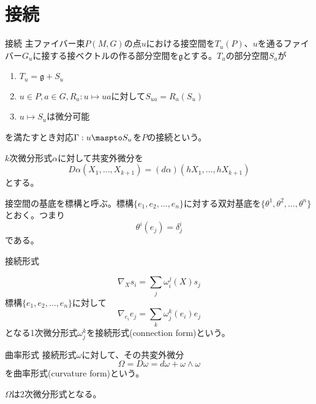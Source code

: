\section{接続}

\begin{dfn}{接続}
	主ファイバー束$P(M, G)$の点$u$における接空間を$T_u(P)$、$u$を通るファイバー$G_u$に接する接ベクトルの作る部分空間を$\mathfrak{g}$とする。$T_u$の部分空間$S_u$が
	\begin{enumerate}
		\item $T_u = \mathfrak{g} + S_u$
		\item $u \in P, a \in G, R_a: u \mapsto ua$に対して$S_{ua} = R_a(S_u)$
		\item $u \mapsto S_u$は微分可能
	\end{enumerate}
	を満たすとき対応$\Gamma: u \maspto S_u$を$P$の接続という。
\end{dfn}

$k$次微分形式$\alpha$に対して共変外微分を
	\[D\alpha(X_1, \ldots, X_{k+1}) = (d\alpha)(hX_1, \ldots, hX_{k+1})\]
とする。

接空間の基底を標構と呼ぶ。標構$\{e_1, e_2, \dots, e_n\}$に対する双対基底を$\{\theta^1, \theta^2, \dots, \theta^n\}$とおく。つまり
	\[\theta^i(e_j) = \delta^i_j\]
である。

\begin{dfn}{接続形式}
	
		\[\nabla_Xs_i = \sum_j \omega^j_i(X)s_j\]
	標構$\{e_1, e_2, \dots, e_n\}$に対して
		\[\nabla_{e_i}e_j = \sum_k \omega^k_j(e_i)e_j\]
	となる1次微分形式$\omega^k_j$を接続形式(connection form)という。
\end{dfn}

\begin{dfn}{曲率形式}
	接続形式$\omega$に対して、その共変外微分
		\[\Omega = D\omega = d\omega + \omega \wedge \omega\]
	を曲率形式(curvature form)という。
\end{dfn}
$\Omega$は2次微分形式となる。


